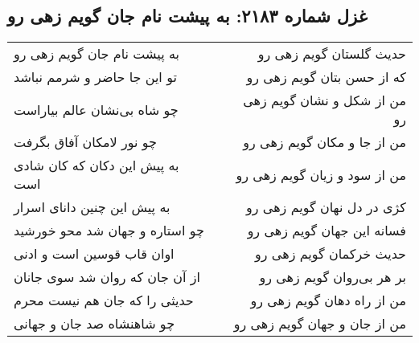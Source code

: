 \begin{center}
\section*{غزل شماره ۲۱۸۳: به پیشت نام جان گویم زهی رو}
\label{sec:2183}
\begin{longtable}{l p{0.5cm} r}
به پیشت نام جان گویم زهی رو
&&
حدیث گلستان گویم زهی رو
\\
تو این جا حاضر و شرمم نباشد
&&
که از حسن بتان گویم زهی رو
\\
چو شاه بی‌نشان عالم بیاراست
&&
من از شکل و نشان گویم زهی رو
\\
چو نور لامکان آفاق بگرفت
&&
من از جا و مکان گویم زهی رو
\\
به پیش این دکان که کان شادی است
&&
من از سود و زیان گویم زهی رو
\\
به پیش این چنین دانای اسرار
&&
کژی در دل نهان گویم زهی رو
\\
چو استاره و جهان شد محو خورشید
&&
فسانه این جهان گویم زهی رو
\\
اوان قاب قوسین است و ادنی
&&
حدیث خرکمان گویم زهی رو
\\
از آن جان که روان شد سوی جانان
&&
بر هر بی‌روان گویم زهی رو
\\
حدیثی را که جان هم نیست محرم
&&
من از راه دهان گویم زهی رو
\\
چو شاهنشاه صد جان و جهانی
&&
من از جان و جهان گویم زهی رو
\\
\end{longtable}
\end{center}
